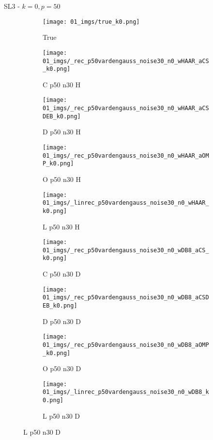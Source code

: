 \begin{frame}{SL3 - $k=0,p=50$}{}
\begin{figure}
\begin{subfigure}{0.1\textwidth}
\texttt{[image: 01\_imgs/true\_k0.png]}
\caption*{\Tiny True}
\end{subfigure}
\begin{subfigure}{0.1\textwidth}
\texttt{[image: 01\_imgs/\_rec\_p50vardengauss\_noise30\_n0\_wHAAR\_aCS\_k0.png]}
\caption*{\Tiny C p50 n30 H}
\end{subfigure}
\begin{subfigure}{0.1\textwidth}
\texttt{[image: 01\_imgs/\_rec\_p50vardengauss\_noise30\_n0\_wHAAR\_aCSDEB\_k0.png]}
\caption*{\Tiny D p50 n30 H}
\end{subfigure}
\begin{subfigure}{0.1\textwidth}
\texttt{[image: 01\_imgs/\_rec\_p50vardengauss\_noise30\_n0\_wHAAR\_aOMP\_k0.png]}
\caption*{\Tiny O p50 n30 H}
\end{subfigure}
\begin{subfigure}{0.1\textwidth}
\texttt{[image: 01\_imgs/\_linrec\_p50vardengauss\_noise30\_n0\_wHAAR\_k0.png]}
\caption*{\Tiny L p50 n30 H}
\end{subfigure}
\begin{subfigure}{0.1\textwidth}
\texttt{[image: 01\_imgs/\_rec\_p50vardengauss\_noise30\_n0\_wDB8\_aCS\_k0.png]}
\caption*{\Tiny C p50 n30 D}
\end{subfigure}
\begin{subfigure}{0.1\textwidth}
\texttt{[image: 01\_imgs/\_rec\_p50vardengauss\_noise30\_n0\_wDB8\_aCSDEB\_k0.png]}
\caption*{\Tiny D p50 n30 D}
\end{subfigure}
\begin{subfigure}{0.1\textwidth}
\texttt{[image: 01\_imgs/\_rec\_p50vardengauss\_noise30\_n0\_wDB8\_aOMP\_k0.png]}
\caption*{\Tiny O p50 n30 D}
\end{subfigure}
\begin{subfigure}{0.1\textwidth}
\texttt{[image: 01\_imgs/\_linrec\_p50vardengauss\_noise30\_n0\_wDB8\_k0.png]}
\caption*{\Tiny L p50 n30 D}
\end{subfigure}
\end{figure}
\end{frame}


